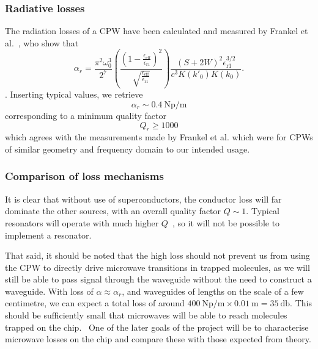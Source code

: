 \subsubsection*{Radiative losses}

The radiation losses of a CPW have been calculated and measured by Frankel et
al.~\cite{Frankel1991}, who show that
\begin{equation}
  \alpha_r = \frac{\pi^2 \omega_0^3}{2^7}\left(\frac{\left(1 -
  \frac{\epsilon_\mathrm{eff}}{\epsilon_\mathrm{r1}}\right)^2}{\sqrt{\frac{\epsilon_\mathrm{eff}}{\epsilon_\mathrm{r1}}}}\right)
  \frac{(S+2W)^2\epsilon_\mathrm{r1}^{3/2}}{c^3 K(k'_0)K(k_0)}.
\end{equation}.
Inserting typical values, we retrieve
\begin{equation}
  \alpha_r \sim \SI{0.4}{\neper\per\metre}
\end{equation}
corresponding to a minimum quality factor
\begin{equation}
  Q_r \geq 1000
\end{equation}
which agrees with the measurements made by Frankel et al. which were for CPWs of
similar geometry and frequency domain to our intended usage.

\subsubsection*{Comparison of loss mechanisms}

It is clear that without use of superconductors, the conductor loss will far
dominate the other sources, with an overall quality factor $Q\sim1$. Typical
resonators will operate with much higher $Q$~\cite{}, so it will not be possible
to implement a resonator.

That said, it should be noted that the high loss should not prevent us from
using the CPW to directly drive microwave transitions in trapped molecules, as
we will still be able to pass signal through the waveguide without the need to
construct a waveguide. With loss of $\alpha \approx \alpha_r$, and waveguides of
lengths on the scale of a few centimetre, we can expect a total loss of around
$\SI{400}{\neper\per\metre} \times \SI{0.01}{\metre} = \SI{35}{\decibel}$. This
should be sufficiently small that microwaves will be able to reach molecules
trapped on the chip.~\cite{Treutlein2008}
%
One of the later goals of the project will be to characterise microwave losses
on the chip and compare these with those expected from theory.

